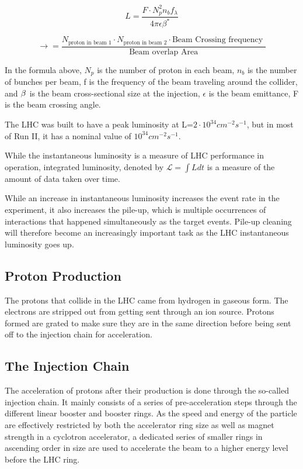 \begin{equation}
    L = \frac{F \cdot N^{2}_{p} n_{b} f_{\lambda}}{4\pi\epsilon \beta^{*}}
\end{equation}


\begin{equation}
    \rightarrow = \frac{N_{\textrm{proton in beam 1}} \cdot N_{\textrm{proton in beam 2}} \cdot \textrm{Beam Crossing frequency }}{\textrm{Beam overlap Area}}
\end{equation}

In the formula above, $N_p$ is the number of proton in each beam, $n_{b}$ is the number of bunches per beam, f is the frequency of the beam traveling around the collider, and $\beta^{\*}$ is the beam cross-sectional size at the injection, $\epsilon$ is the beam emittance, F is the beam crossing angle.

The LHC was built to have a peak luminosity at L=$2 \cdot 10^{34}cm^{-2}s^{-1}$, but in most of Run II, it has a nominal value of $10^{34}cm^{-2}s^{-1}$.

While the instantaneous luminosity is a measure of LHC performance in operation, integrated luminosity, denoted by $\mathcal{L} = \int L dt$ is a measure of the amount of data taken over time.

While an increase in instantaneous luminosity increases the event rate in the experiment, it also increases the pile-up, which is multiple occurrences of interactions that happened simultaneously as the target events. Pile-up cleaning will therefore become an increasingly important task as the LHC instantaneous luminosity goes up.

\subsection{Proton Production}
The protons that collide in the LHC came from hydrogen in gaseous form. The electrons are stripped out from getting sent through an ion source. Protons formed are grated to make sure they are in the same direction before being sent off to the injection chain for acceleration. 

\subsection{The Injection Chain}
The acceleration of protons after their production is done through the so-called injection chain. It mainly consists of a series of pre-acceleration steps through the different linear booster and booster rings. As the speed and energy of the particle are effectively restricted by both the accelerator ring size as well as magnet strength in a cyclotron accelerator, a dedicated series of smaller rings in ascending order in size are used to accelerate the beam to a higher energy level before the LHC ring.


